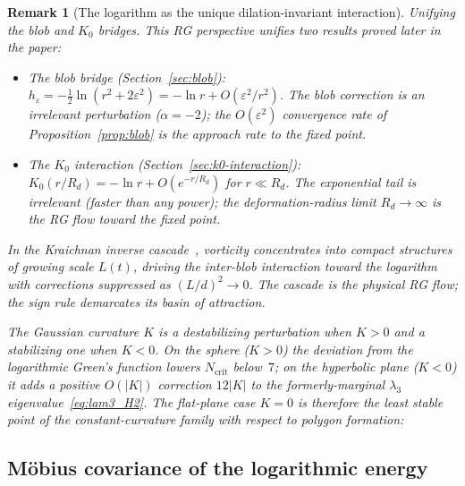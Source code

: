 \documentclass[12pt, a4paper]{article}
\newtheorem{remark}{Remark}[section]
\numberwithin{equation}{section}
\begin{document}
\begin{remark}[The logarithm as the unique dilation-invariant interaction]
\smallskip
\noindent\emph{Unifying the blob and $K_0$ bridges.}
This RG perspective unifies two results proved later in the paper:
\begin{itemize}
  \item The blob bridge
    (Section~\ref{sec:blob}):
    $h_\varepsilon = -\tfrac{1}{2}\ln(r^2 + 2\varepsilon^2)
    = -\ln r + O(\varepsilon^2/r^2)$.  The blob correction
    is an irrelevant perturbation ($\alpha = -2$);
    the $O(\varepsilon^2)$ convergence rate of
    Proposition~\ref{prop:blob} is the approach rate to the
    fixed point.
  \item The $K_0$ interaction
    (Section~\ref{sec:k0-interaction}):
    $K_0(r/R_d) = -\ln r + O(e^{-r/R_d})$ for $r \ll R_d$.
    The exponential tail is irrelevant (faster than any power);
    the deformation-radius limit $R_d \to \infty$ is the RG flow
    toward the fixed point.
\end{itemize}
In the Kraichnan inverse cascade~\citep{Kraichnan1967}, vorticity
concentrates into compact structures of growing scale $L(t)$, driving
the inter-blob interaction toward the logarithm with corrections
suppressed as $(L/d)^2 \to 0$.  The cascade is the physical
RG flow; the sign rule demarcates its basin of attraction.

The Gaussian curvature $K$ is a destabilizing perturbation when
$K>0$ and a stabilizing one when $K<0$.  On the sphere ($K>0$) the
deviation from the logarithmic Green's function lowers
$N_{\mathrm{crit}}$ below~$7$; on the hyperbolic plane ($K<0$) it
adds a positive $O(|K|)$ correction $12|K|$ to the formerly-marginal
$\lambda_3$ eigenvalue~\eqref{eq:lam3_H2}.  The flat-plane case
$K=0$ is therefore the \emph{least stable} point of the
constant-curvature family with respect to polygon formation:

\subsection{M\"obius covariance of the logarithmic energy}
\label{sec:mobius-cov}


\end{remark}
\end{document}

